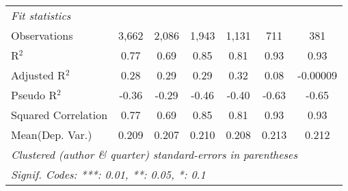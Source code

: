\begin{tabular}{lcccccc}
   \midrule
   \emph{Fit statistics}\\
   Observations                                               & 3,662          & 2,086        & 1,943   & 1,131   & 711          & 381\\  
   R$^2$                                                      & 0.77           & 0.69         & 0.85    & 0.81    & 0.93         & 0.93\\  
   Adjusted R$^2$                                             & 0.28           & 0.29         & 0.29    & 0.32    & 0.08         & -0.00009\\  
   Pseudo R$^2$                                               & -0.36          & -0.29        & -0.46   & -0.40   & -0.63        & -0.65\\  
   Squared Correlation                                        & 0.77           & 0.69         & 0.85    & 0.81    & 0.93         & 0.93\\  
Mean(Dep. Var.) & 0.209 & 0.207 & 0.210 & 0.208 & 0.213 & 0.212 \\
   \midrule \midrule
   \multicolumn{7}{l}{\emph{Clustered (author \& quarter) standard-errors in parentheses}}\\
   \multicolumn{7}{l}{\emph{Signif. Codes: ***: 0.01, **: 0.05, *: 0.1}}\\
\end{tabular}
\par\endgroup
